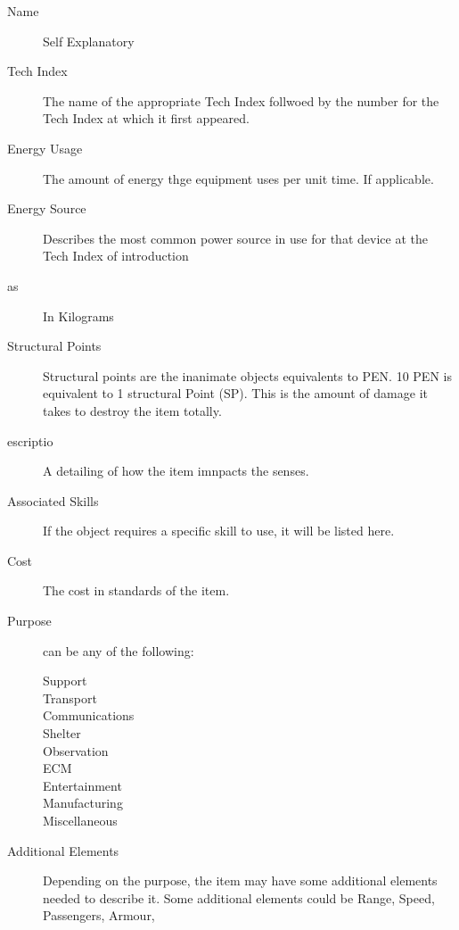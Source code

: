 \begin{description}
	\item[Name]
	Self Explanatory
	\item[Tech Index]
	The name of the appropriate Tech Index follwoed by the number for 
	the Tech Index at which it first appeared.
	\item[Energy Usage]
	The amount of energy thge equipment uses per unit time. If 
	applicable.
	\item[Energy Source]
	Describes the most common power source in use for that device at 
	the Tech Index of introduction
	\item[as]
	In Kilograms
	\item[Structural Points]
	Structural points are the in\-ani\-mate ob\-jects equivalents to PEN. 
	10 PEN is equivalent to 1 structural Point (SP). This is the amount 
	of damage it takes to destroy the item totally.
	\item[escriptio]
	A detailing of how the item imnpacts the senses.
	\item[Associated Skills ]
	If the object requires a specific skill to use, it will be listed 
	here.                 
	\item[Cost]
	The cost in standards of the item. 
	\item[Purpose]
	can be any of the following:
	\begin{description}
		\item[Support]
		\item[Transport]
		\item[Communications]
		\item[Shelter]
		\item[Observation]
		\item[ECM]
		\item[Entertainment]
		\item[Manufacturing]
		\item[Miscellaneous]
	\end{description}
	\item[Additional Elements]
	Depending on the pur\-pose, the item may have some additional elements 
	needed to describe it. Some additional elements could be Range, Speed, Passengers, Armour, 
\end{description}


